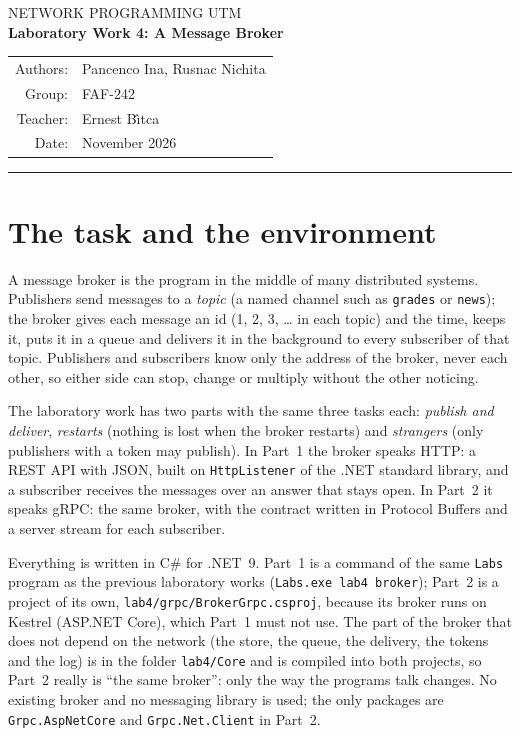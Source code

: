 \documentclass[11pt,a4paper]{article}
\newcommand{\code}[1]{{\frenchspacing\texttt{#1}}}
\begin{document}
\begin{center}
  {\small NETWORK PROGRAMMING \textperiodcentered{} UTM}\\[6pt]
  {\LARGE\bfseries Laboratory Work 4: A Message Broker}\\[10pt]
  \begin{tabular}{rl}
    Authors: & Pancenco Ina, Rusnac Nichita \\
    Group:   & FAF-242 \\
    Teacher: & Ernest B\^{\i}tca \\
    Date:    & November 2026
  \end{tabular}
\end{center}
\vspace{4pt}\hrule\vspace{8pt}

\section{The task and the environment}

A message broker is the program in the middle of many distributed systems. Publishers send messages
to a \emph{topic} (a named channel such as \code{grades} or \code{news}); the broker gives each
message an id (1, 2, 3, \dots{} in each topic) and the time, keeps it, puts it in a queue and
delivers it in the background to every subscriber of that topic. Publishers and subscribers know
only the address of the broker, never each other, so either side can stop, change or multiply
without the other noticing.

The laboratory work has two parts with the same three tasks each: \emph{publish and deliver},
\emph{restarts} (nothing is lost when the broker restarts) and \emph{strangers} (only publishers with
a token may publish). In Part~1 the broker speaks HTTP: a REST API with JSON, built on
\code{HttpListener} of the .NET standard library, and a subscriber receives the messages over an
answer that stays open. In Part~2 it speaks gRPC: the same broker, with the contract written in
Protocol Buffers and a server stream for each subscriber.

Everything is written in C\# for .NET~9. Part~1 is a command of the same \code{Labs} program as the
previous laboratory works (\code{Labs.exe lab4 broker}); Part~2 is a project of its own,
\code{lab4/grpc/BrokerGrpc.csproj}, because its broker runs on Kestrel (ASP.NET Core), which Part~1
must not use. The part of the broker that does not depend on the network (the store, the queue,
the delivery, the tokens and the log) is in the folder \code{lab4/Core} and is compiled into both
projects, so Part~2 really is ``the same broker'': only the way the programs talk changes. No
existing broker and no messaging library is used; the only packages are \code{Grpc.AspNetCore} and
\code{Grpc.Net.Client} in Part~2.
\end{document}
